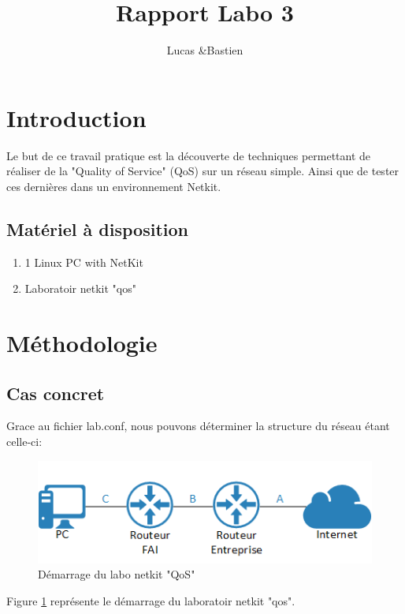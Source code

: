 \documentclass{article}
\title{Rapport Labo 3}
\author{Lucas \bsc{Bulloni} \&Bastien \bsc{Wermeille}}
\begin{document}
\maketitle

 

\section{Introduction}
 Le but de ce travail pratique est la découverte de techniques permettant de réaliser de la "Quality of Service" (QoS) sur un réseau simple. Ainsi que de tester ces dernières dans un environnement Netkit.

\subsection{Matériel à disposition}
\begin{enumerate}
\item 1 Linux PC with NetKit
\item Laboratoir netkit "qos"
\end{enumerate}

\section{Méthodologie}


\subsection{Cas concret}
Grace au fichier lab.conf, nous pouvons déterminer la structure du réseau étant celle-ci:
\begin{figure}
  \includegraphics[width=\linewidth]{./Structure.png}
  \caption{Démarrage du labo netkit "QoS"}
  \label{fig:qos}
\end{figure}

Figure \ref{fig:qos} représente le démarrage du laboratoir netkit "qos".
\end{document}
